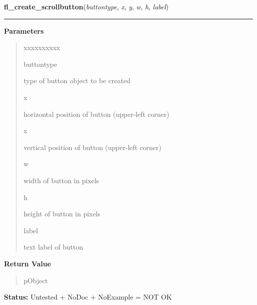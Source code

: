     \label{xformslib:library:fl_create_scrollbutton}

    \vspace{0.5ex}

\hspace{.8\funcindent}\begin{boxedminipage}{\funcwidth}

    \raggedright \textbf{fl\_create\_scrollbutton}(\textit{buttontype}, \textit{x}, \textit{y}, \textit{w}, \textit{h}, \textit{label})

    \vspace{-1.5ex}

    \rule{\textwidth}{0.5\fboxrule}
\setlength{\parskip}{2ex}
\setlength{\parskip}{1ex}
      \textbf{Parameters}
      \vspace{-1ex}

      \begin{quote}
        \begin{Ventry}{xxxxxxxxxx}

          \item[buttontype]

          type of button object to be created

          \item[x]

          horizontal position of button (upper-left corner)

          \item[x]

          vertical position of button (upper-left corner)

          \item[w]

          width of button in pixels

          \item[h]

          height of button in pixels

          \item[label]

          text label of button

        \end{Ventry}

      \end{quote}

      \textbf{Return Value}
    \vspace{-1ex}

      \begin{quote}
      pObject

      \end{quote}

\textbf{Status:} Untested + NoDoc + NoExample = NOT OK



    \end{boxedminipage}


